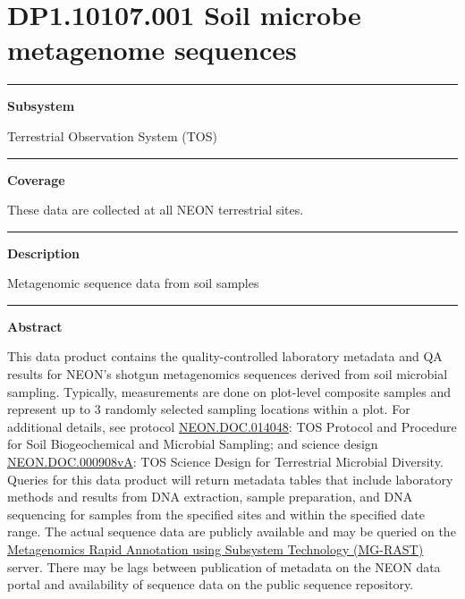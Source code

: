 \documentclass[]{article}
\begin{document}
\section{DP1.10107.001 Soil microbe metagenome
sequences}\label{dp1.10107.001-soil-microbe-metagenome-sequences}

\begin{center}\rule{0.5\linewidth}{\linethickness}\end{center}

\textbf{Subsystem}

Terrestrial Observation System (TOS)

\begin{center}\rule{0.5\linewidth}{\linethickness}\end{center}

\textbf{Coverage}

These data are collected at all NEON terrestrial sites.

\begin{center}\rule{0.5\linewidth}{\linethickness}\end{center}

\textbf{Description}

Metagenomic sequence data from soil samples

\begin{center}\rule{0.5\linewidth}{\linethickness}\end{center}

\textbf{Abstract}

This data product contains the quality-controlled laboratory metadata
and QA results for NEON's shotgun metagenomics sequences derived from
soil microbial sampling. Typically, measurements are done on plot-level
composite samples and represent up to 3 randomly selected sampling
locations within a plot. For additional details, see protocol
\href{http://data.neonscience.org/api/v0/documents/NEON.DOC.014048vJ}{NEON.DOC.014048}:
TOS Protocol and Procedure for Soil Biogeochemical and Microbial
Sampling; and science design
\href{http://data.neonscience.org/api/v0/documents/NEON.DOC.000908vA}{NEON.DOC.000908vA}:
TOS Science Design for Terrestrial Microbial Diversity. Queries for this
data product will return metadata tables that include laboratory methods
and results from DNA extraction, sample preparation, and DNA sequencing
for samples from the specified sites and within the specified date
range. The actual sequence data are publicly available and may be
queried on the \href{http://metagenomics.anl.gov/}{Metagenomics Rapid
Annotation using Subsystem Technology (MG-RAST)} server. There may be
lags between publication of metadata on the NEON data portal and
availability of sequence data on the public sequence repository.
\end{document}
